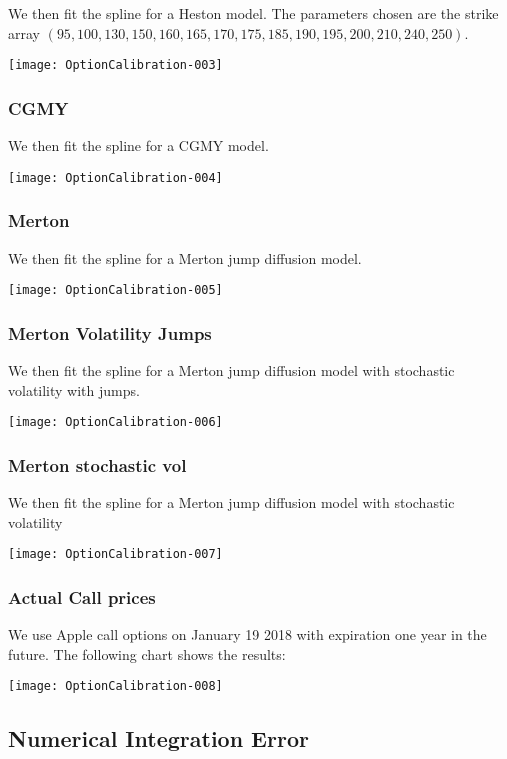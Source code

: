 \documentclass{article}
\begin{document}
We then fit the spline for a Heston model.  The parameters chosen are the strike array \((95,100,130,150,160,165,170,175,185,190,195,200,210,240,250)\).

\texttt{[image: OptionCalibration-003]}


\subsubsection{CGMY}

We then fit the spline for a CGMY model.

\texttt{[image: OptionCalibration-004]}

\subsubsection{Merton}

We then fit the spline for a Merton jump diffusion model.

\texttt{[image: OptionCalibration-005]}

\subsubsection{Merton Volatility Jumps}

We then fit the spline for a Merton jump diffusion model with stochastic volatility with jumps.

\texttt{[image: OptionCalibration-006]}

\subsubsection{Merton stochastic vol}

We then fit the spline for a Merton jump diffusion model with stochastic volatility

\texttt{[image: OptionCalibration-007]}

\subsubsection{Actual Call prices}

We use Apple call options on January 19 2018 with expiration one year in the future.  The following chart shows the results:

\texttt{[image: OptionCalibration-008]}

\subsection{Numerical Integration Error}
\end{document}
